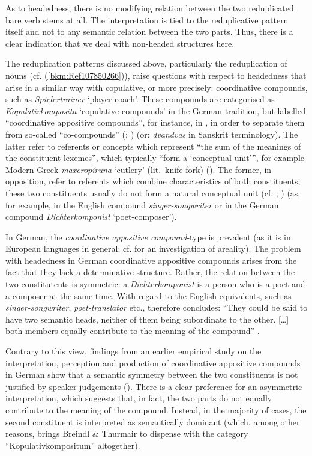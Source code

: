 \documentclass[output=paper
  ,nobabel
  ,draftmode
  ,colorlinks, citecolor=brown
]{langscibook}
\begin{document}
As to headedness, there is no modifying relation between the two reduplicated bare verb stems at
all. The interpretation is tied to the reduplicative pattern itself and not to any semantic relation
between the two parts. Thus, there is a clear indication that we deal with non-headed structures
here.

The reduplication patterns discussed above, particularly the reduplication of nouns
(cf. (\ref{bkm:Ref107850266})), raise questions with respect to headedness that arise in a similar
way with copulative, or more precisely: coordinative compounds, such as \emph{Spielertrainer}
`player-coach'. These compounds are categorised as \emph{Kopulativkomposita} `copulative compounds'
in the German tradition, but labelled ``coordinative appositive compounds'', for instance, in , in order to separate them from so-called ``co-compounds'' (\citealt{Waelchli2005};
\citealt{Arcodia2018}) (or: \emph{dvandvas} in Sanskrit terminology). The latter refer to referents
or concepts which represent ``the sum of the meanings of the constituent lexemes'', which typically
``form a `conceptual unit''', for example Modern Greek \emph{maxeropíruna} `cutlery' (lit.\
knife-fork) (\citealt[1198–1199]{Arcodia2018}). The former, in opposition, refer to referents which
combine characteristics of both constituents; these two constituents usually do not form a natural
conceptual unit (cf. \citealt[5]{Waelchli2005}; \citealt[1198]{Arcodia2018}) (as, for example, in the
English compound \emph{singer-songwriter} or in the German compound \emph{Dichterkomponist}
`poet-composer').

In German, the \emph{coordinative appositive compound}{}-type is prevalent (as it is in European
languages in general; cf. \citealt{Arcodia2018} for an investigation of areality). The problem with
headedness in German coordinative appositive compounds arises from the fact that they lack a
determinative structure. Rather, the relation between the two constitutents is symmetric: a
\emph{Dichterkomponist} is a person who is a poet and a composer at the same time. With regard to
the English equivalents, such as \emph{singer-songwriter}, \emph{poet-translator} etc.,
\citet{Plag2003} therefore concludes: ``They could be said to have two semantic heads, neither of
them being subordinate to the other. […] both members equally contribute to the meaning of the
compound'' \citep[146]{Plag2003}.

Contrary to this view, findings from an earlier empirical study on the interpretation, perception
and production of coordinative appositive compounds in German show that a semantic symmetry between
the two constituents is not justified by speaker judgements (\citealt{BreindlThurmair1992}). There
is a clear preference for an asymmetric interpretation, which suggests that, in fact, the two parts
do not equally contribute to the meaning of the compound. Instead, in the majority of cases, the
second constituent is interpreted as semantically dominant (which, among other reasons, brings
Breindl \& Thurmair to dispense with the category ``Kopulativkompositum'' altogether).
\end{document}

